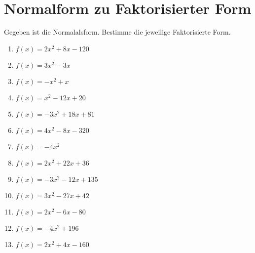 \documentclass{article}%
\begin{document}
\section{Normalform zu Faktorisierter Form}%
\label{sec:NormalformzuFaktorisierterForm}%
Gegeben ist die Normalalsform. Bestimme die jeweilige Faktorisierte Form.%
\begin{enumerate}[label=\alph*)]%
\item%
\newline\vspace{0.5cm} $f(x)=2x^2 + 8x - 120$%
\item%
\newline\vspace{0.5cm} $f(x)=3x^2 - 3x$%
\item%
\newline\vspace{0.5cm} $f(x)=-x^2 + x$%
\item%
\newline\vspace{0.5cm} $f(x)=x^2 - 12x + 20$%
\item%
\newline\vspace{0.5cm} $f(x)=-3x^2 + 18x + 81$%
\item%
\newline\vspace{0.5cm} $f(x)=4x^2 - 8x - 320$%
\item%
\newline\vspace{0.5cm} $f(x)=-4x^2$%
\item%
\newline\vspace{0.5cm} $f(x)=2x^2 + 22x + 36$%
\item%
\newline\vspace{0.5cm} $f(x)=-3x^2 - 12x + 135$%
\item%
\newline\vspace{0.5cm} $f(x)=3x^2 - 27x + 42$%
\item%
\newline\vspace{0.5cm} $f(x)=2x^2 - 6x - 80$%
\item%
\newline\vspace{0.5cm} $f(x)=-4x^2 + 196$%
\item%
\newline\vspace{0.5cm} $f(x)=2x^2 + 4x - 160$%

\end{enumerate}
\end{document}
